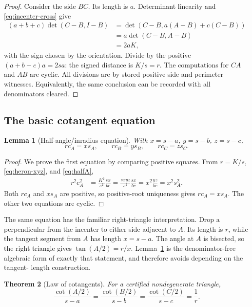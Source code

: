 \documentclass[11pt,letterpaper]{article}
\newtheorem{theorem}{Theorem}[section]
\newtheorem{lemma}[theorem]{Lemma}
\theoremstyle{definition}
\theoremstyle{remark}
\newcommand{\detm}[2]{\det\!\left(#1,#2\right)}
\begin{document}
\begin{proof}
Consider the side \(BC\).  Its length is \(a\).  Determinant linearity and
\eqref{eq:incenter-cross} give
\begin{align*}
 (a+b+c)\detm{C-B}{I-B}
 &=\detm{C-B}{a(A-B)+c(C-B)}\\
 &=a\detm{C-B}{A-B}\\
 &=2aK,
\end{align*}
with the sign chosen by the orientation.  Divide by the positive
\((a+b+c)a=2sa\): the signed distance is \(K/s=r\).  The computations for
\(CA\) and \(AB\) are cyclic.  All divisions are by stored positive side and
perimeter witnesses.  Equivalently, the same conclusion can be recorded with
all denominators cleared.
\end{proof}

\subsection{The basic cotangent equation}

\begin{lemma}[Half-angle/inradius equation]
\label{lem:cot-basic}
With \(x=s-a\), \(y=s-b\), \(z=s-c\),
\[
 r c_A=x s_A,
 \qquad
 r c_B=y s_B,
 \qquad
 r c_C=z s_C.
 \tag{6.3}\label{eq:cot-basic}
\]
\end{lemma}

\begin{proof}
We prove the first equation by comparing positive squares.  From
\(r=K/s\), \eqref{eq:heron-xyz}, and \eqref{eq:halfA},
\begin{align*}
 r^2c_A^2
 &=\frac{K^2}{s^2}\frac{sx}{bc}
 =\frac{sxyz}{s^2}\frac{sx}{bc}
 =x^2\frac{yz}{bc}
 =x^2s_A^2.
\end{align*}
Both \(rc_A\) and \(xs_A\) are positive, so positive-root uniqueness gives
\(rc_A=xs_A\).  The other two equations are cyclic.
\end{proof}

The same equation has the familiar right-triangle interpretation.  Drop a
perpendicular from the incenter to either side adjacent to \(A\).  Its length
is \(r\), while the tangent segment from \(A\) has length \(x=s-a\).  The
angle at \(A\) is bisected, so the right triangle gives
\(\tan(A/2)=r/x\).  Lemma~\ref{lem:cot-basic} is the denominator-free algebraic
form of exactly that statement, and therefore avoids depending on the tangent-
length construction.

\begin{theorem}[Law of cotangents]
\label{thm:cotangent-law}
For a certified nondegenerate triangle,
\[
 \frac{\cot(A/2)}{s-a}
 =\frac{\cot(B/2)}{s-b}
 =\frac{\cot(C/2)}{s-c}
 =\frac1r.
 \tag{6.4}\label{eq:cotangent-law}
\]
\end{theorem}
\end{document}
